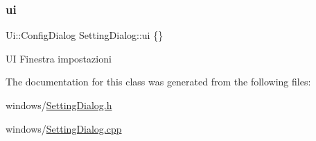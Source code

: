 \subsubsection{\texorpdfstring{ui}{ui}}
{\footnotesize\ttfamily Ui\+::\+Config\+Dialog Setting\+Dialog\+::ui \{\}}

UI Finestra impostazioni 

The documentation for this class was generated from the following files\+:\begin{DoxyCompactItemize}
\item 
windows/\hyperlink{_setting_dialog_8h}{Setting\+Dialog.\+h}\item 
windows/\hyperlink{_setting_dialog_8cpp}{Setting\+Dialog.\+cpp}\end{DoxyCompactItemize}
